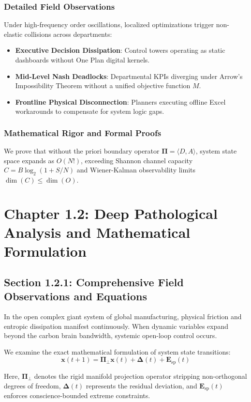 \documentclass[12pt,a4paper,oneside]{book}
\begin{document}
\subsection*{Detailed Field Observations}
Under high-frequency order oscillations, localized optimizations trigger non-elastic collisions across departments:
\begin{itemize}
    \item \textbf{Executive Decision Dissipation}: Control towers operating as static dashboards without One Plan digital kernels.
    \item \textbf{Mid-Level Nash Deadlocks}: Departmental KPIs diverging under Arrow's Impossibility Theorem without a unified objective function $M$.
    \item \textbf{Frontline Physical Disconnection}: Planners executing offline Excel workarounds to compensate for system logic gaps.
\end{itemize}

\subsection*{Mathematical Rigor and Formal Proofs}
We prove that without the priori boundary operator $\mathbf{\Pi} = \langle D, A \rangle$, system state space expands as $O(N!)$, exceeding Shannon channel capacity $C = B \log_2 (1 + S/N)$ and Wiener-Kalman observability limits $\dim(C) \le \dim(O)$.
\clearpage
\chapter{Chapter 1.2: Deep Pathological Analysis and Mathematical Formulation}
\section{Section 1.2.1: Comprehensive Field Observations and Equations}

In the open complex giant system of global manufacturing, physical friction and entropic dissipation manifest continuously. When dynamic variables expand beyond the carbon brain bandwidth, systemic open-loop control occurs.

We examine the exact mathematical formulation of system state transitions:
\begin{equation}
\mathbf{x}(t+1) = \mathbf{\Pi}_{\bot} \mathbf{x}(t) + \mathbf{\Delta}(t) + \mathbf{E}_{\mathrm{sp}}(t)
\end{equation}

Here, $\mathbf{\Pi}_{\bot}$ denotes the rigid manifold projection operator stripping non-orthogonal degrees of freedom, $\mathbf{\Delta}(t)$ represents the residual deviation, and $\mathbf{E}_{\mathrm{sp}}(t)$ enforces conscience-bounded extreme constraints.
\end{document}
